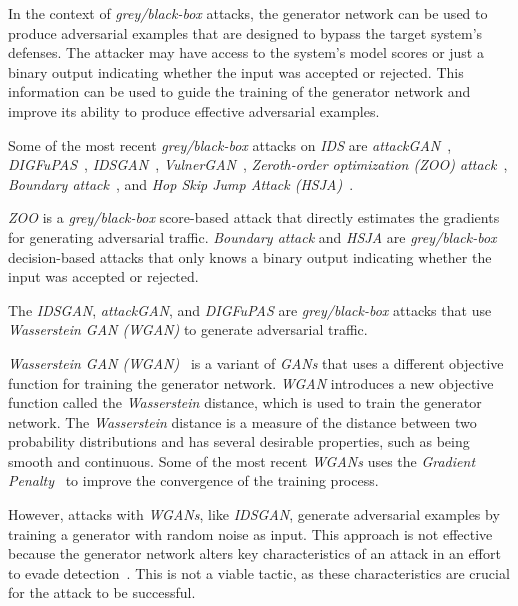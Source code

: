 In the context of \textit{grey/black-box} attacks, the generator network can be used to produce adversarial examples
that are designed to bypass the target system's defenses.
The attacker may have access to the system's model scores or just a binary output indicating whether the input was
accepted or rejected.
This information can be used to guide the training of the generator network and improve its ability to produce
effective adversarial examples.

Some of the most recent \textit{grey/black-box} attacks on \textit{IDS} are
\textit{attackGAN}~\cite{zhao2021attackgan}, \textit{DIGFuPAS}~\cite{duy2021digfupas},
\textit{IDSGAN}~\cite{lin2022idsgan}, \textit{VulnerGAN}~\cite{liu2022vulnergan},
\textit{Zeroth-order optimization (ZOO) attack}~\cite{chen2017zoo}, \textit{Boundary attack}~\cite{brendel2017decision},
and \textit{Hop Skip Jump Attack (HSJA)}~\cite{chen2019boundary}.

\textit{ZOO} is a \textit{grey/black-box} score-based attack that directly estimates the gradients for generating
adversarial traffic.
\textit{Boundary attack} and \textit{HSJA} are \textit{grey/black-box} decision-based attacks that only knows
a binary output indicating whether the input was accepted or rejected.

The \textit{IDSGAN}, \textit{attackGAN}, and \textit{DIGFuPAS} are \textit{grey/black-box} attacks that use
\textit{Wasserstein GAN (WGAN)} to generate adversarial traffic.

\textit{Wasserstein GAN (WGAN)}~\cite{gulrajani2017improved} is a variant of \textit{GANs} that uses a different
objective function for training the generator network.
\textit{WGAN} introduces a new objective function called the \textit{Wasserstein} distance, which is used to train the
generator network.
The \textit{Wasserstein} distance is a measure of the distance between two probability distributions and has several
desirable properties, such as being smooth and continuous.
Some of the most recent \textit{WGANs} uses the \textit{Gradient Penalty}~\cite{gulrajani2017improved} to improve
the convergence of the training process.

However, attacks with \textit{WGANs}, like \textit{IDSGAN}, generate adversarial examples by training a generator
with random noise as input.
This approach is not effective because the generator network alters key characteristics of an attack in an effort to
evade detection~\cite{usama2019generative}.
This is not a viable tactic, as these characteristics are crucial for the attack to be successful.
